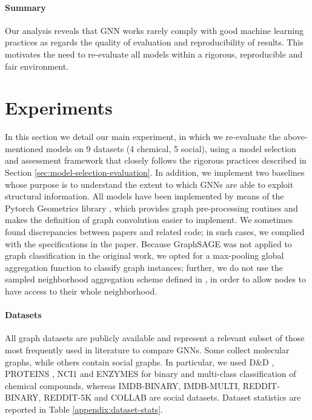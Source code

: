 \documentclass{article}
\begin{document}
\paragraph{Summary} Our analysis reveals that GNN works rarely comply with good machine learning practices as regards the quality of evaluation and reproducibility of results. This motivates the need to re-evaluate all models within a rigorous, reproducible and fair environment. \section{Experiments}
In this section we detail our main experiment, in which we re-evaluate the above-mentioned models on 9 datasets (4 chemical, 5 social), using a model selection and assessment framework that closely follows the rigorous practices described in Section \ref{sec:model-selection-evaluation}. In addition, we implement two baselines whose purpose is to understand the extent to which GNNs are able to exploit structural information.
All models have been implemented by means of the Pytorch Geometrics library \citep{pytorch-geometric}, which provides graph pre-processing routines and makes the definition of graph convolution easier to implement. We sometimes found discrepancies between papers and related code; in such cases, we complied with the specifications in the paper. Because GraphSAGE was not applied to graph classification in the original work, we opted for a max-pooling global aggregation function to classify graph instances; further, we do not use the sampled neighborhood aggregation scheme defined in \cite{graphsage}, in order to allow nodes to have access to their whole neighborhood.

\paragraph{Datasets} All graph datasets are publicly available \citep{datasets-dortmund} and represent a relevant subset of those most frequently used in literature to compare GNNs. Some collect molecular graphs, while others contain social graphs. In particular, we used D\&D \citep{dd}, PROTEINS \citep{proteins}, NCI1 \citep{nci1} and ENZYMES \citep{enzymes-dataset} for binary and multi-class classification of chemical compounds, whereas IMDB-BINARY, IMDB-MULTI, REDDIT-BINARY, REDDIT-5K and COLLAB \citep{deep-graphlet-kernel-imdb-reddit-collab} are social datasets. Dataset statistics are reported in Table \ref{appendix:dataset-stats}.
\end{document}
